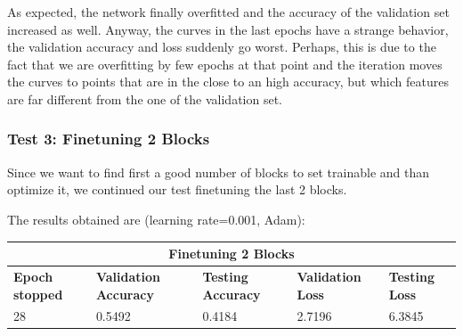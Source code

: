 As expected, the network finally overfitted and the accuracy of the validation set increased as well. Anyway, the curves in the last epochs have a strange behavior, the validation accuracy and loss suddenly go worst. Perhaps, this is due to the fact that we are overfitting by few epochs at that point and the iteration moves the curves to points that are in the close to an high accuracy, but which features are far different from the one of the validation set.



\subsubsection{Test 3: Finetuning 2 Blocks}
Since we want to find first a good number of blocks to set trainable and than optimize it, we continued our test finetuning the last 2 blocks.

\noindent The results obtained are (learning rate=0.001, Adam):

\medskip

\begin{tabular}{ |p{2cm}|p{2cm}|p{2cm}|p{2cm}|p{2cm}|  }
\hline
\multicolumn{5}{|c|}{Finetuning 2 Blocks} \\
\hline
\textbf{Epoch stopped} & \textbf{Validation Accuracy} & \textbf{Testing Accuracy} & \textbf{Validation Loss} & \textbf{Testing Loss} \\
\hline
28 & 0.5492 & 0.4184 & 2.7196 & 6.3845\\
\hline
\end{tabular}

